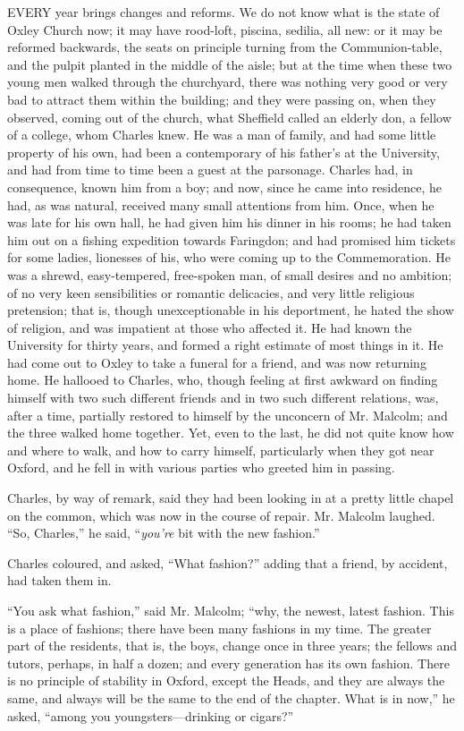 EVERY year brings changes and reforms.
We do not know what is the state of Oxley Church now; it may have
rood-loft, piscina, sedilia, all new: or it may be reformed backwards,
the seats on principle turning from the Communion-table, and the
pulpit planted in the middle of the aisle; but at the time when these
two young men walked through the churchyard, there was nothing very
good or very bad to attract them within the building; and they were
passing on, when they observed, coming out of the church, what
Sheffield called an elderly don, a fellow of a college, whom Charles
knew. He was a man of family, and had some little property of his own,
had been a contemporary of his father's at the University, and had
from time to time been a guest at the parsonage. Charles had, in
consequence, known him from a boy; and now, since he came into
residence, he had, as was natural, received many small attentions from
him. Once, when he was late for his own hall, he had given him his
dinner in his rooms; he had taken him out on a fishing expedition
towards Faringdon; and had promised him tickets for some ladies,
lionesses of his, who were coming up to the Commemoration. He was
a shrewd, easy-tempered, free-spoken man, of small desires and no
ambition; of no very keen sensibilities or romantic delicacies, and
very little religious pretension; that is, though unexceptionable in
his deportment, he hated the show of religion, and was impatient at
those who affected it. He had known the University for thirty years,
and formed a right estimate of most things in it. He had come out to
Oxley to take a funeral for a friend, and was now returning home. He
hallooed to Charles, who, though feeling at first awkward on finding
himself with two such different friends and in two such different
relations, was, after a time, partially restored to himself by the
unconcern of Mr. Malcolm; and the three walked home together. Yet,
even to the last, he did not quite know how and where to walk, and how
to carry himself, particularly when they got near Oxford, and he fell
in with various parties who greeted him in passing.

Charles, by way of remark, said they had been looking in at a
pretty little chapel on the common, which was now in the course of
repair. Mr. Malcolm laughed. ``So, Charles,'' he said, ``\emph{you're}
bit with the new fashion.''

Charles coloured, and asked, ``What fashion?'' adding that
a friend, by accident, had taken them in.

``You ask what fashion,'' said Mr. Malcolm; ``why, the
newest, latest fashion. This is a place of fashions; there have been
many fashions in my time. The greater part of the residents, that is,
the boys, change once in three years; the fellows and tutors, perhaps,
in half a dozen; and every generation has its own fashion. There is no
principle of stability in Oxford, except the Heads, and they are
always the same, and always will be the same to the end of the
chapter. What is in now,'' he asked, ``among you youngsters—drinking
or cigars?''

